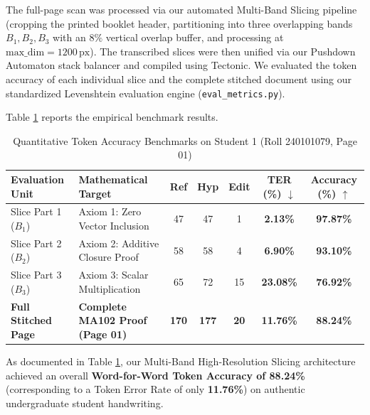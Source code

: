 The full-page scan was processed via our automated Multi-Band Slicing pipeline (cropping the printed booklet header, partitioning into three overlapping bands $B_1, B_2, B_3$ with an $8\%$ vertical overlap buffer, and processing at $\text{max\_dim} = 1200\,\text{px}$). The transcribed slices were then unified via our Pushdown Automaton stack balancer and compiled using Tectonic. We evaluated the token accuracy of each individual slice and the complete stitched document using our standardized Levenshtein evaluation engine (\texttt{eval\_metrics.py}).

Table \ref{tab:student1_slicing_benchmark} reports the empirical benchmark results.

\begin{table}[htbp]
\centering
\caption{Quantitative Token Accuracy Benchmarks on Student 1 (Roll 240101079, Page 01)}
\label{tab:student1_slicing_benchmark}
\vspace{0.2cm}
\small
\setlength{\tabcolsep}{4pt}
\begin{tabular}{p{2.2cm}p{3.5cm}ccccc}
\toprule
\textbf{Evaluation Unit} & \textbf{Mathematical Target} & \textbf{Ref} & \textbf{Hyp} & \textbf{Edit} & \textbf{TER (\%)} $\downarrow$ & \textbf{Accuracy (\%)} $\uparrow$ \\
\midrule
Slice Part 1 ($B_1$) & Axiom 1: Zero Vector Inclusion & 47 & 47 & 1 & \textbf{2.13\%} & \textbf{97.87\%} \\
Slice Part 2 ($B_2$) & Axiom 2: Additive Closure Proof & 58 & 58 & 4 & \textbf{6.90\%} & \textbf{93.10\%} \\
Slice Part 3 ($B_3$) & Axiom 3: Scalar Multiplication & 65 & 72 & 15 & \textbf{23.08\%} & \textbf{76.92\%} \\
\midrule
\textbf{Full Stitched Page} & \textbf{Complete MA102 Proof (Page 01)} & \textbf{170} & \textbf{177} & \textbf{20} & \textbf{11.76\%} & \textbf{88.24\%} \\
\bottomrule
\end{tabular}
\end{table}

As documented in Table \ref{tab:student1_slicing_benchmark}, our Multi-Band High-Resolution Slicing architecture achieved an overall \textbf{Word-for-Word Token Accuracy of 88.24\%} (corresponding to a Token Error Rate of only \textbf{11.76\%}) on authentic undergraduate student handwriting. 

